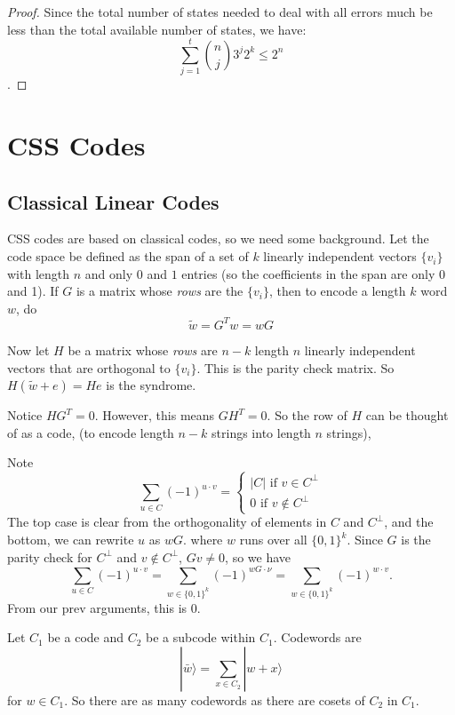 \documentclass[12pt]{article}
\begin{document}
\begin{proof}
Since the total number of states needed to deal with all errors much be less than the total available number of states, we have:
$$\sum_{j=1}^t\binom{n}{j}3^j2^k\leq 2^n$$.

 



\end{proof}

\section{CSS Codes}

\subsection{Classical Linear Codes}
CSS codes are based on classical codes, so we need some background. Let the code space be
defined as the span of a set of $k$ linearly independent vectors $\{v_i\}$ with length $n$ and only $0$ and $1$ entries
(so the coefficients in the span are only 0 and 1). If $G$ is a matrix whose {\it{rows}} are the $\{v_i\}$, then to encode a length $k$ word $w$,
do
$$ \tilde{w}=G^Tw=wG$$

Now let $H$ be a matrix whose {\it{rows}} are $n-k$ length $n$ linearly independent vectors that are orthogonal to $\{v_i\}$. This is the parity check matrix. 
So $H(\tilde{w}+e)=He$ is the syndrome. 

Notice $HG^T=0$. However, this means $GH^T=0$. So the row of $H$ can be thought of as a code, (to encode length $n-k$ strings into length $n$ strings), 

Note 
$$\sum_{u\in C}(-1)^{u \cdot v}=\begin{cases} |C|\text{ if } v\in C^\bot\\ 0 \text{ if } v\notin C^\bot \end{cases} $$
The top case is clear from the orthogonality of elements in $C$ and $C^\bot$, and the bottom, we can rewrite $u$ as $wG$.
where $w$ runs over all $\{0,1\}^k$. Since $G$ is the parity check for $C^\bot$ and $v\notin C^\bot$, $Gv\neq 0$, so we have
$$\sum_{u\in C}(-1)^{u \cdot v}=\sum_{w\in\{0,1\}^k}(-1)^{wG\cdot\nu}=\sum_{w\in\{0,1\}^k}(-1)^{w\cdot v }.$$ From our prev arguments, this is 0.

Let $C_1$ be a code and $C_2$ be a subcode within $C_1$. Codewords are
$$|\bar{w}\rangle=\sum_{x\in C_2}|w+x\rangle$$
for $w\in C_1$.
So there are as many codewords as there are cosets of $C_2$ in $C_1$. 
\end{document}
